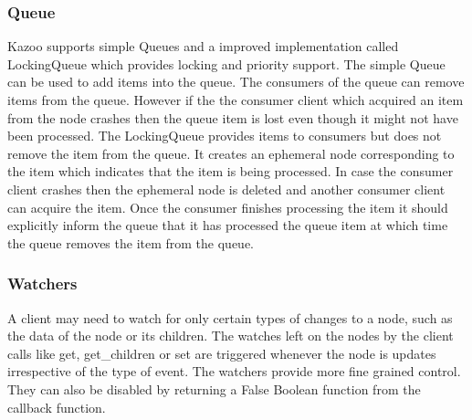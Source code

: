   \subsubsection{Queue}
    Kazoo supports simple Queues and a improved implementation called LockingQueue which provides locking and priority support. The simple Queue can be used to add items into the queue. The consumers of the queue can remove items from the queue. However if the the consumer client which acquired an item from the node crashes then the queue item is lost even though it might not have been processed. The LockingQueue provides items to consumers but does not remove the item from the queue. It creates an ephemeral node corresponding to the item which indicates that the item is being processed. In case the consumer client crashes then the ephemeral node is deleted and another consumer client can acquire the item. Once the consumer finishes processing the item it should explicitly inform the queue that it has processed the queue item at which time the queue removes the item from the queue.
  \subsubsection{Watchers}
  A client may need to watch for only certain types of changes to a node, such as the data of the node or its children. The watches left on the nodes by the client calls like get, get\_children or set are triggered whenever the node is updates irrespective of the type of event. The watchers provide more fine grained control. They can also be disabled by returning a False Boolean function from the callback function.
  
